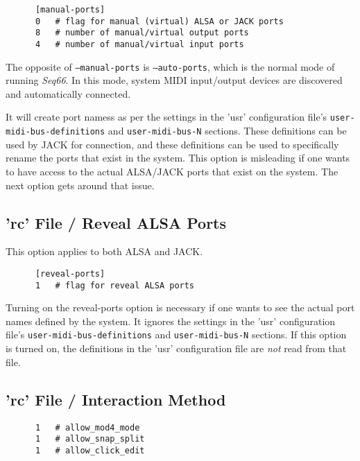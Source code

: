    \begin{verbatim}
      [manual-ports]
      0   # flag for manual (virtual) ALSA or JACK ports
      8   # number of manual/virtual output ports
      4   # number of manual/virtual input ports
   \end{verbatim}

   The opposite of \texttt{--manual-ports} is \texttt{--auto-ports},
   which is the normal mode of running \textsl{Seq66}.
   In this mode, system MIDI input/output devices are discovered and
   automatically connected.

   It will create port namess as per the settings in the 'usr' configuration
   file's \texttt{user-midi-bus-definitions} and \texttt{user-midi-bus-N}
   sections.  These definitions can be used by JACK for connection, and these
   definitions can be used to specifically rename the ports that exist in the
   system.
   This option is misleading if one wants to have access to the
   actual ALSA/JACK ports that exist on the system.
   The next option gets around that issue.

\subsection{'rc' File / Reveal ALSA Ports}
\label{subsec:configuration_reveal_ports}

   This option applies to both ALSA and JACK.

   \begin{verbatim}
      [reveal-ports]
      1   # flag for reveal ALSA ports
   \end{verbatim}

   Turning on the reveal-ports option is necessary if one
   wants to see the actual port names defined by the system.
   It ignores the settings in the 'usr' configuration file's
   \texttt{user-midi-bus-definitions} and \texttt{user-midi-bus-N} sections.
   If this option is turned on, the definitions in the
   'usr' configuration file are \textsl{not} read from that file.

\subsection{'rc' File / Interaction Method}
\label{subsec:configuration_interaction}

   \begin{verbatim}
      1   # allow_mod4_mode
      1   # allow_snap_split
      1   # allow_click_edit
   \end{verbatim}

